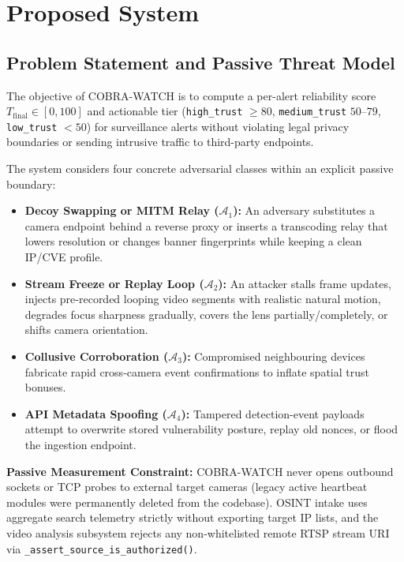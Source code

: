\chapter{Proposed System}

\section{Problem Statement and Passive Threat Model}
The objective of COBRA-WATCH is to compute a per-alert reliability score $T_{\mathrm{final}} \in [0, 100]$ and actionable tier (\texttt{high\_trust} $\ge 80$, \texttt{medium\_trust} $50\text{--}79$, \texttt{low\_trust} $< 50$) for surveillance alerts without violating legal privacy boundaries or sending intrusive traffic to third-party endpoints.

The system considers four concrete adversarial classes within an explicit passive boundary:
\begin{itemize}
  \item \textbf{Decoy Swapping or MITM Relay ($\mathcal{A}_1$):} An adversary substitutes a camera endpoint behind a reverse proxy or inserts a transcoding relay that lowers resolution or changes banner fingerprints while keeping a clean IP/CVE profile.
  \item \textbf{Stream Freeze or Replay Loop ($\mathcal{A}_2$):} An attacker stalls frame updates, injects pre-recorded looping video segments with realistic natural motion, degrades focus sharpness gradually, covers the lens partially/completely, or shifts camera orientation.
  \item \textbf{Collusive Corroboration ($\mathcal{A}_3$):} Compromised neighbouring devices fabricate rapid cross-camera event confirmations to inflate spatial trust bonuses.
  \item \textbf{API Metadata Spoofing ($\mathcal{A}_4$):} Tampered detection-event payloads attempt to overwrite stored vulnerability posture, replay old nonces, or flood the ingestion endpoint.
\end{itemize}

\textbf{Passive Measurement Constraint:} COBRA-WATCH never opens outbound sockets or TCP probes to external target cameras (legacy active heartbeat modules were permanently deleted from the codebase). OSINT intake uses aggregate search telemetry strictly without exporting target IP lists, and the video analysis subsystem rejects any non-whitelisted remote RTSP stream URI via \texttt{\_assert\_source\_is\_authorized()}.

